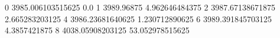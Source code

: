 0 3985.006103515625 0.0
1 3989.96875 4.962646484375
2 3987.67138671875 2.665283203125
4 3986.23681640625 1.230712890625
6 3989.391845703125 4.3857421875
8 4038.05908203125 53.052978515625
